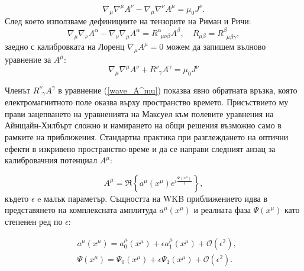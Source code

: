 \begin{equation}
	\nabla_\mu \nabla^\mu A^\nu - \nabla_\mu \nabla^\nu A^\mu = \mu_0 J^\nu.
\end{equation}
След което използваме дефинициите на тензорите на Риман и Ричи:
\begin{equation}
	\nabla_\mu \nabla_\nu A^\alpha - \nabla_\nu \nabla_\mu A^\alpha = R^\alpha_{\,\,\,\mu\nu\beta} A^\beta, \quad R_{\mu\beta} = R^\beta_{\,\,\,\mu\beta\gamma},
\end{equation} 
заедно с калибровката на Лоренц $\nabla_{\mu} A^\mu = 0$ можем да запишем вълново уравнение за $A^\mu$:
\begin{equation}\label{wave_A^mu}
	\nabla_{\mu}\nabla^\mu A^\nu + R^\nu_{\,\,\,\gamma} A^\gamma = \mu_0 J^\nu
\end{equation}

Членът $R^\nu_{\,\,\,\gamma} A^\gamma$ в уравнение (\ref{wave_A^mu}) показва явно обратната връзка, която електромагнитното поле оказва върху пространство времето. Присъствието му прави зацепването на уравненията на Максуел към полевите уравнения на Айнщайн-Хилбърт сложно и намирането на общи решения възможно само в рамките на приближения. Стандартна практика при разглеждането на оптични ефекти в изкривено пространство-време и да се направи следният анзац за калибровачния потенциал $A^\mu$:

\begin{equation}\label{A^mu_anzatz}
	A^\mu = \Re\left\{a^\mu(x^\mu)e^{i\frac{\Psi(x^\mu)}{\epsilon}}\right\},
\end{equation}
където $\epsilon$ e малък параметър. Същността на WKB приближението идва в представянето на комплексната амплитуда $a^\mu(x^\mu)$ и реалната фаза $\Psi(x^\mu)$ като степенен ред по $\epsilon$:

\begin{equation}
	\begin{split}
		&a^\mu(x^\mu) = a_0^\mu(x^\mu) + \epsilon a_1^\mu(x^\mu) + \mathcal{O}(\epsilon^2),\\
		&\Psi(x^\mu) = \Psi_0(x^\mu) + \epsilon \Psi_1(x^\mu) + \mathcal{O}(\epsilon^2).\\
	\end{split}
\end{equation}

